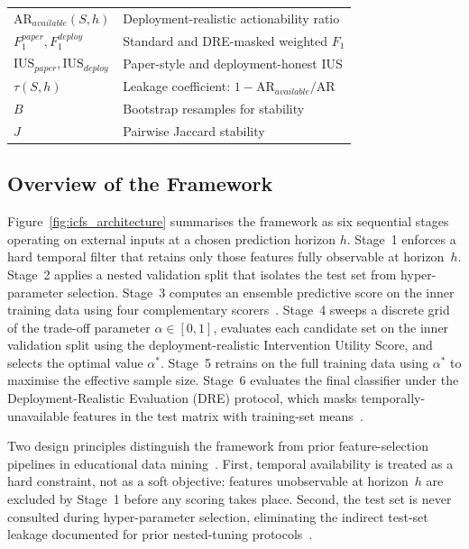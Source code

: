 \documentclass[a4paper,fleqn]{cas-sc}
\begin{document}
\begin{table}[htbp]
\begin{tabular}{ll}
$\mathrm{AR}_{available}(S, h)$     & Deployment-realistic actionability ratio \\
$F_1^{paper}, F_1^{deploy}$         & Standard and DRE-masked weighted $F_1$ \\
$\mathrm{IUS}_{paper}, \mathrm{IUS}_{deploy}$ & Paper-style and deployment-honest IUS \\
$\tau(S, h)$                        & Leakage coefficient: $1 - \mathrm{AR}_{available} / \mathrm{AR}$ \\
$B$                                 & Bootstrap resamples for stability \\
$J$                                 & Pairwise Jaccard stability \\
\bottomrule
\end{tabular}
\end{table}

\subsection{Overview of the Framework}
\label{sec:icfs:overview}

Figure~\ref{fig:icfs_architecture} summarises the framework as six sequential stages operating on external inputs at a chosen prediction horizon $h$. Stage~1 enforces a hard temporal filter that retains only those features fully observable at horizon~$h$. Stage~2 applies a nested validation split that isolates the test set from hyper-parameter selection. Stage~3 computes an ensemble predictive score on the inner training data using four complementary scorers~\citep{chandrashekar2014}. Stage~4 sweeps a discrete grid of the trade-off parameter $\alpha \in [0, 1]$, evaluates each candidate set on the inner validation split using the deployment-realistic Intervention Utility Score, and selects the optimal value $\alpha^*$. Stage~5 retrains on the full training data using $\alpha^*$ to maximise the effective sample size. Stage~6 evaluates the final classifier under the Deployment-Realistic Evaluation (DRE) protocol, which masks temporally-unavailable features in the test matrix with training-set means~\citep{kaufman2012,kapoor2023}.

Two design principles distinguish the framework from prior feature-selection pipelines in educational data mining~\citep{romero2020,viberg2018}. First, temporal availability is treated as a hard constraint, not as a soft objective: features unobservable at horizon~$h$ are excluded by Stage~1 before any scoring takes place.
Second, the test set is never consulted during hyper-parameter selection, eliminating the indirect test-set leakage documented for prior nested-tuning protocols~\citep{kaufman2012,kapoor2023}.
\end{document}
